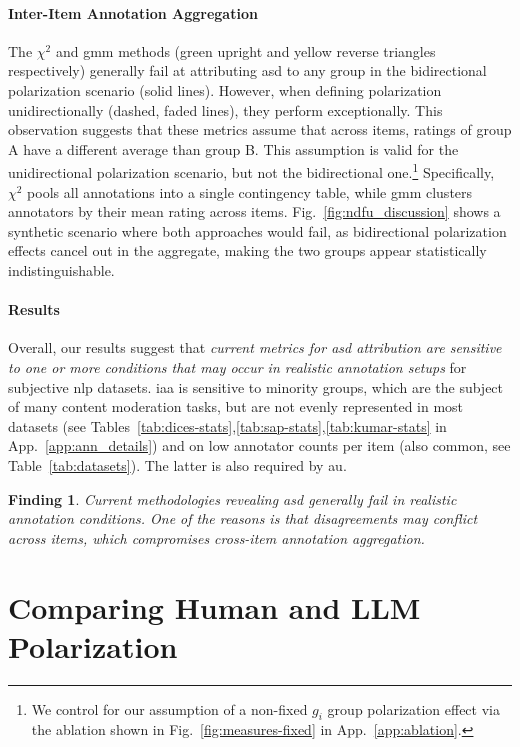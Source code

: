 \documentclass[manuscript,screen,review,anonymous]{acmart}
\theoremstyle{acmplain}
\newtheorem{finding}{Finding}
\theoremstyle{researchquestionstyle}
\begin{document}
\paragraph{Inter-Item Annotation Aggregation} The $\chi^2$ and \ac{gmm} methods (green upright and yellow reverse triangles respectively) generally fail at attributing \ac{asd} to any group in the bidirectional polarization scenario (solid lines). However, when defining polarization unidirectionally (dashed, faded lines), they perform exceptionally. This observation suggests that these metrics assume that across items, ratings of group A have a different average than group B. This assumption is valid for the unidirectional polarization scenario, but not the bidirectional one.\footnote{We control for our assumption of a non-fixed $g_i$ group polarization effect via the ablation shown in Fig.~\ref{fig:measures-fixed} in App.~\ref{app:ablation}.} Specifically, $\chi^2$ pools all annotations into a single contingency table, while \ac{gmm} clusters annotators by their mean rating across items. Fig.~\ref{fig:ndfu_discussion} shows a synthetic scenario where both approaches would fail, as bidirectional polarization effects cancel out in the aggregate, making the two groups appear statistically indistinguishable.

\paragraph{Results} Overall, our results suggest that \emph{current metrics for \ac{asd} attribution are sensitive to one or more conditions that may occur in realistic annotation setups} for subjective \ac{nlp} datasets. \ac{iaa} is sensitive to minority groups, which are the subject of many content moderation tasks, but are not evenly represented in most datasets (see Tables~\ref{tab:dices-stats},\ref{tab:sap-stats},\ref{tab:kumar-stats} in App.~\ref{app:ann_details}) and on low annotator counts per item (also common, see Table~\ref{tab:datasets}). The latter is also required by \ac{au}.

\begin{finding}
	\label{finding:methods}
	Current methodologies revealing \ac{asd} generally fail in realistic annotation conditions. One of the reasons is that disagreements may conflict across items, which compromises cross-item annotation aggregation.
\end{finding}


\section{Comparing Human and LLM Polarization}
\label{sec:apunim}
\end{document}
